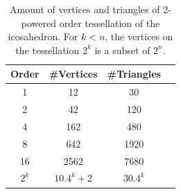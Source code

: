 \documentclass[twoside,twocolumn,10pt]{article}
\begin{document}

\begin{table}[]
\centering
\begin{tabular}{|c|c|c|c|}
\hline
\textbf{Order} & \textbf{\#Vertices} & \textbf{\#Triangles} \\ \hline
1              & 12                 & 30                  \\ \hline
2              & 42                 & 120                 \\ \hline
4              & 162                & 480                 \\ \hline
8              & 642                & 1920                \\ \hline
16             & 2562               & 7680                \\ \hline
$2^k$          & $10.4^k + 2$ & $30.4^k$           \\ \hline
\end{tabular}
\caption{Amount of vertices and triangles of 2-powered order tessellation of the icosahedron. For $k<n$, the vertices on the tessellation $2^k$ is a subset of $2^n$.}
\label{tab::icosahedron_set}
\end{table}




\end{document}
